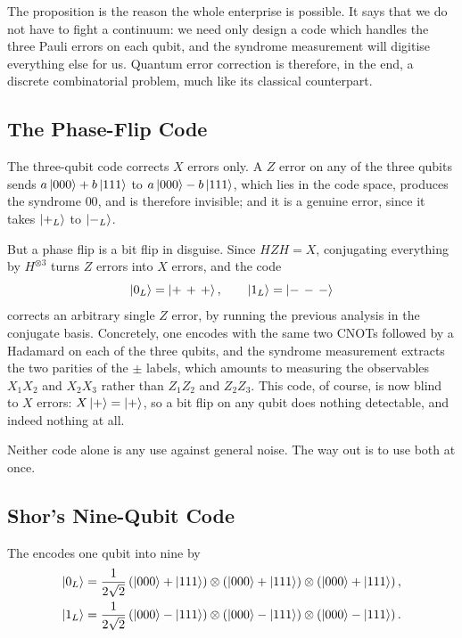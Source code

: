 \documentclass[a4paper]{scrartcl}
\begin{document}
The proposition is the reason the whole enterprise is possible. It says that we do not have to fight a continuum: we need only design a code which handles the three Pauli errors on each qubit, and the syndrome measurement will digitise everything else for us. Quantum error correction is therefore, in the end, a discrete combinatorial problem, much like its classical counterpart.

\subsection{The Phase-Flip Code}

The three-qubit code corrects $X$ errors only. A $Z$ error on any of the three qubits sends $a\ket{000}+b\ket{111}$ to $a\ket{000}-b\ket{111}$, which lies in the code space, produces the syndrome $00$, and is therefore invisible; and it is a genuine error, since it takes $\ket{+_L}$ to $\ket{-_L}$.

But a phase flip is a bit flip in disguise. Since $HZH = X$, conjugating everything by $H^{\otimes3}$ turns $Z$ errors into $X$ errors, and the code
$$\ket{0_L} = \ket{+\,+\,+}, \qquad \ket{1_L} = \ket{-\,-\,-}$$
corrects an arbitrary single $Z$ error, by running the previous analysis in the conjugate basis. Concretely, one encodes with the same two CNOTs followed by a Hadamard on each of the three qubits, and the syndrome measurement extracts the two parities of the $\pm$ labels, which amounts to measuring the observables $X_1X_2$ and $X_2X_3$ rather than $Z_1Z_2$ and $Z_2Z_3$. This code, of course, is now blind to $X$ errors: $X\ket{+} = \ket+$, so a bit flip on any qubit does nothing detectable, and indeed nothing at all.

Neither code alone is any use against general noise. The way out is to use both at once.

\subsection{Shor's Nine-Qubit Code}

\begin{definition}
	The  encodes one qubit into nine by
	\begin{align*}
		\ket{0_L} &= \frac{1}{2\sqrt2}\left(\ket{000}+\ket{111}\right)\otimes\left(\ket{000}+\ket{111}\right)\otimes\left(\ket{000}+\ket{111}\right),\\
		\ket{1_L} &= \frac{1}{2\sqrt2}\left(\ket{000}-\ket{111}\right)\otimes\left(\ket{000}-\ket{111}\right)\otimes\left(\ket{000}-\ket{111}\right).
	\end{align*}
\end{definition}
\end{document}
